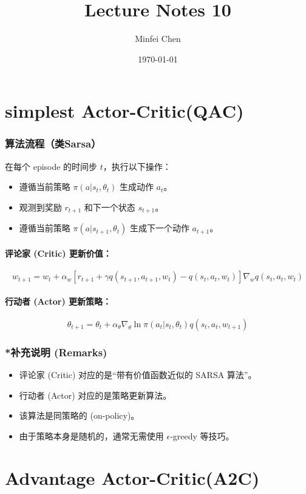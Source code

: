 \documentclass{article}
\begin{document}
\title{Lecture Notes 10}
\author{Minfei Chen}
\date{\today}
\maketitle
\section{simplest Actor-Critic(QAC)}
\subsubsection*{算法流程（类Sarsa）}
在每个 episode 的时间步 $t$，执行以下操作：
\begin{itemize}
    \item 遵循当前策略 $\pi(a|s_t, \theta_t)$ 生成动作 $a_t$。
    \item 观测到奖励 $r_{t+1}$ 和下一个状态 $s_{t+1}$。
    \item 遵循当前策略 $\pi(a|s_{t+1}, \theta_t)$ 生成下一个动作 $a_{t+1}$。
\end{itemize}

\paragraph{评论家 (Critic) 更新价值：}
\[
w_{t+1} = w_t + \alpha_w [r_{t+1} + \gamma q(s_{t+1}, a_{t+1}, w_t) - q(s_t, a_t, w_t)] \nabla_w q(s_t, a_t, w_t)
\]

\paragraph{行动者 (Actor) 更新策略：}
\[
\theta_{t+1} = \theta_t + \alpha_{\theta} \nabla_{\theta} \ln \pi(a_t|s_t, \theta_t) q(s_t, a_t, w_{t+1})
\]

\subsubsection*{*补充说明 (Remarks)}
\begin{itemize}
    \item 评论家 (Critic) 对应的是“带有价值函数近似的 SARSA 算法”。
    \item 行动者 (Actor) 对应的是策略更新算法。
    \item 该算法是同策略的 (on-policy)。
    \item 由于策略本身是随机的，通常无需使用 $\epsilon$-greedy 等技巧。
\end{itemize}
\section{Advantage Actor-Critic(A2C)}
\end{document}
